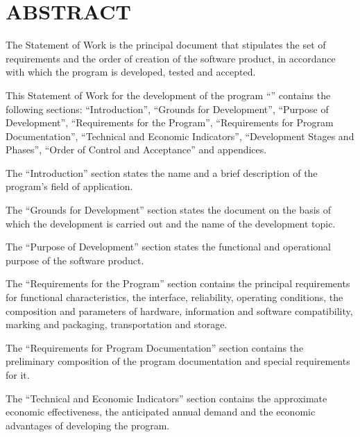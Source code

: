 \documentclass[12pt,a4paper]{extarticle}
\begin{document}
\sloppy



\section*{ABSTRACT}

The Statement of Work is the principal document that stipulates the set of requirements and the order of creation of the software product, in accordance with which the program is developed, tested and accepted.

This Statement of Work for the development of the program \enquote{\hseProjectName} contains the following sections: \enquote{Introduction}, \enquote{Grounds for Development}, \enquote{Purpose of Development}, \enquote{Requirements for the Program}, \enquote{Requirements for Program Documentation}, \enquote{Technical and Economic Indicators}, \enquote{Development Stages and Phases}, \enquote{Order of Control and Acceptance} and appendices\cite{gost19101}.

The \enquote{Introduction} section states the name and a brief description of the program's field of application.

The \enquote{Grounds for Development} section states the document on the basis of which the development is carried out and the name of the development topic.

The \enquote{Purpose of Development} section states the functional and operational purpose of the software product.

The \enquote{Requirements for the Program} section contains the principal requirements for functional characteristics, the interface, reliability, operating conditions, the composition and parameters of hardware, information and software compatibility, marking and packaging, transportation and storage.

The \enquote{Requirements for Program Documentation} section contains the preliminary composition of the program documentation and special requirements for it.

The \enquote{Technical and Economic Indicators} section contains the approximate economic effectiveness, the anticipated annual demand and the economic advantages of developing the program.
\end{document}
